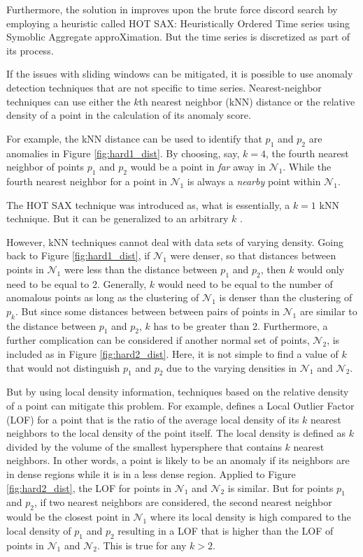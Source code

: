 Furthermore, the solution in \cite{Keogh2005} improves upon the brute force discord search by employing a heuristic called HOT SAX: Heuristically Ordered Time series using Symoblic Aggregate approXimation. But the time series is discretized as part of its process.

If the issues with sliding windows can be mitigated, it is possible to use anomaly detection techniques that are not specific to time series. Nearest-neighbor techniques can use either the $k$th nearest neighbor (kNN) distance or the relative density of a point in the calculation of its anomaly score.

For example, the kNN distance can be used to identify that $p_1$ and $p_2$ are anomalies in Figure \ref{fig:hard1_dist}. By choosing, say, $k=4$, the fourth nearest neighbor of points $p_1$ and $p_2$ would be a point in \emph{far} away in $\mathcal{N}_1$. While the fourth nearest neighbor for a point in $\mathcal{N}_1$ is always a \emph{nearby} point within $\mathcal{N}_1$. 

The HOT SAX technique was introduced as, what is essentially, a $k=1$ kNN technique. But it can be generalized to an arbitrary $k$ \cite{Keogh2007} \cite{Yankov2008}.

However, kNN techniques cannot deal with data sets of varying density. Going back to Figure \ref{fig:hard1_dist}, if $\mathcal{N}_1$ were denser, so that distances between points in $\mathcal{N}_1$ were less than the distance between $p_1$ and $p_2$, then $k$ would only need to be equal to 2. Generally, $k$ would need to be equal to the number of anomalous points as long as the clustering of $\mathcal{N}_1$ is denser than the clustering of $p_k$. But since some distances between between pairs of points in $\mathcal{N}_1$ are similar to the distance between $p_1$ and $p_2$, $k$ has to be greater than 2. Furthermore, a further complication can be considered if another normal set of points, $\mathcal{N}_2$, is included as in Figure \ref{fig:hard2_dist}. Here, it is not simple to find a value of $k$ that would not distinguish $p_1$ and $p_2$ due to the varying densities in $\mathcal{N}_1$ and $\mathcal{N}_2$.

But by using local density information, techniques based on the relative density of a point can mitigate this problem. For example, \cite{Breunig1999} defines a Local Outlier Factor (LOF) for a point that is the ratio of the average local density of its $k$ nearest neighbors to the local density of the point itself. The local density is defined as $k$ divided by the volume of the smallest hypersphere that contains $k$ nearest neighbors. In other words, a point is likely to be an anomaly if its neighbors are in dense regions while it is in a less dense region. Applied to Figure \ref{fig:hard2_dist}, the LOF for points in $\mathcal{N}_1$ and $\mathcal{N}_2$ is similar. But for points $p_1$ and $p_2$, if two nearest neighbors are considered, the second nearest neighbor would be the closest point in $\mathcal{N}_1$ where its local density is high compared to the local density of $p_1$ and $p_2$ resulting in a LOF that is higher than the LOF of points in $\mathcal{N}_1$ and $\mathcal{N}_2$. This is true for any $k>2$.

